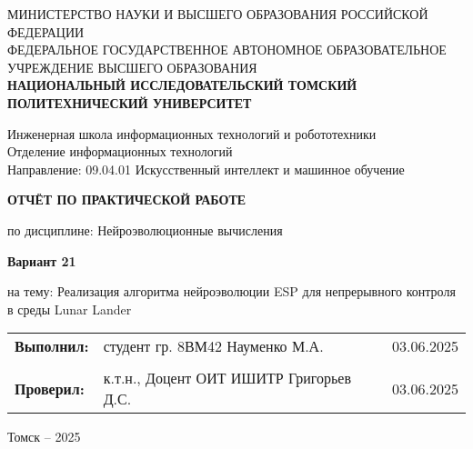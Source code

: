 \documentclass[a4paper,12pt]{article}
\begin{document}
\begin{titlepage}
	\vspace*{1cm}
	{\small
		\begin{center}
			МИНИСТЕРСТВО НАУКИ И ВЫСШЕГО ОБРАЗОВАНИЯ РОССИЙСКОЙ ФЕДЕРАЦИИ\\
			ФЕДЕРАЛЬНОЕ ГОСУДАРСТВЕННОЕ АВТОНОМНОЕ ОБРАЗОВАТЕЛЬНОЕ УЧРЕЖДЕНИЕ ВЫСШЕГО ОБРАЗОВАНИЯ\\
			\textbf{НАЦИОНАЛЬНЫЙ ИССЛЕДОВАТЕЛЬСКИЙ ТОМСКИЙ ПОЛИТЕХНИЧЕСКИЙ УНИВЕРСИТЕТ}
		\end{center}
	}
	\vspace{0.5cm}
	\begin{center}
		Инженерная школа информационных технологий и робототехники\\
		Отделение информационных технологий\\
		Направление: 09.04.01 Искусственный интеллект и машинное обучение
	\end{center}
	\vspace{1cm}
	\begin{center}
		\textbf{ОТЧЁТ ПО ПРАКТИЧЕСКОЙ РАБОТЕ}
	\end{center}
	\begin{center}
		по дисциплине: Нейроэволюционные вычисления
	\end{center}
	\vspace{0.5cm}
	\begin{center}
		\textbf{Вариант 21}
	\end{center}
	\begin{center}
		на тему: Реализация алгоритма нейроэволюции ESP для непрерывного контроля в среды Lunar Lander
	\end{center}
	\vspace{1cm}
	
	\begin{tabular}{p{} p{} p{}}
		\textbf{Выполнил:} & студент гр. 8ВМ42 \newline Науменко М.А. & 03.06.2025 \\
		& & \\
		\textbf{Проверил:} & к.т.н., Доцент ОИТ ИШИТР \newline Григорьев Д.С. & 03.06.2025
	\end{tabular}
	\vfill
	\begin{center}
		Томск – 2025
	\end{center}
\end{titlepage}
\end{document}
